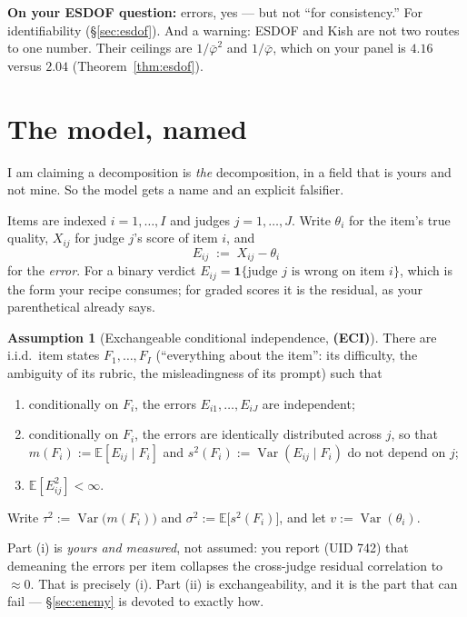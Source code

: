 \documentclass[11pt]{article}
\theoremstyle{plain}
\theoremstyle{definition}
\newtheorem{assumption}{Assumption}
\theoremstyle{remark}
\newcommand{\Var}{\operatorname{Var}}
\newcommand{\E}{\mathbb{E}}
\newcommand{\pb}{\bar{\varphi}}
\begin{document}
\noindent\textbf{On your ESDOF question:} errors, yes --- but not ``for consistency.'' For
identifiability (\S\ref{sec:esdof}). And a warning: ESDOF and Kish are not two routes to one
number. Their ceilings are $1/\pb^2$ and $1/\pb$, which on your panel is $4.16$ versus $2.04$
(Theorem~\ref{thm:esdof}).

\section{The model, named}

I am claiming a decomposition is \emph{the} decomposition, in a field that is yours and not
mine. So the model gets a name and an explicit falsifier.

Items are indexed $i=1,\dots,I$ and judges $j=1,\dots,J$. Write $\theta_i$ for the item's true
quality, $X_{ij}$ for judge $j$'s score of item $i$, and
\[
E_{ij} \;:=\; X_{ij}-\theta_i
\]
for the \emph{error}. For a binary verdict $E_{ij}=\mathbf{1}\{\text{judge }j\text{ is wrong on
item }i\}$, which is the form your recipe consumes; for graded scores it is the residual, as
your parenthetical already says.

\begin{assumption}[Exchangeable conditional independence, \textbf{(ECI)}]\label{ass:eci}
There are i.i.d.\ item states $F_1,\dots,F_I$ (``everything about the item'': its difficulty, the
ambiguity of its rubric, the misleadingness of its prompt) such that
\begin{enumerate}
\item[(i)] conditionally on $F_i$, the errors $E_{i1},\dots,E_{iJ}$ are independent;
\item[(ii)] conditionally on $F_i$, the errors are identically distributed across $j$, so that
$m(F_i):=\E[E_{ij}\mid F_i]$ and $s^2(F_i):=\Var(E_{ij}\mid F_i)$ do not depend on $j$;
\item[(iii)] $\E[E_{ij}^2]<\infty$.
\end{enumerate}
Write $\tau^2:=\Var\!\big(m(F_i)\big)$ and $\sigma^2:=\E\!\big[s^2(F_i)\big]$, and let
$v:=\Var(\theta_i)$.
\end{assumption}

Part (i) is \emph{yours and measured}, not assumed: you report (UID 742) that demeaning the
errors per item collapses the cross-judge residual correlation to $\approx 0$. That is precisely
(i). Part (ii) is exchangeability, and it is the part that can fail --- \S\ref{sec:enemy} is
devoted to exactly how.
\end{document}
